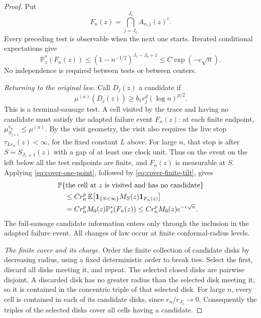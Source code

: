 \documentclass[11pt]{article}
\theoremstyle{definition}
\theoremstyle{remark}
\numberwithin{equation}{section}
\begin{document}
\begin{proof}
Put
\[
 F_n(z)=\bigcap_{j=J_0}^{J_1}A_{n,j}(z)^c.
\]
Every preceding test is observable when the next one starts.
Iterated conditional expectations give
\begin{equation}
 \mathbb P_z^*(F_n(z))
 \le(1-n^{-1/2})^{J_1-J_0+1}
 \le C\exp(-c\sqrt n).
 \label{eq:cover-failure}
\end{equation}
No independence is required between tests or between centers.

\emph{Returning to the original law.}
Call \(D_j(z)\) a candidate if
\begin{equation}
 \mu^{(n)}(D_j(z))\ge b_1r_j^d(\log n)^{p/2}.
 \label{eq:cover-candidate}
\end{equation}
This is a terminal-sausage test. A cell visited by the trace and
having no candidate must satisfy the adapted failure event \(F_n(z)\):
at each finite endpoint, \(\mu_{S_{j+1}}^{v_n}\le\mu^{(n)}\).
By the visit geometry, the visit also requires the
live stop \(\tau_{Lr_n}(z)<\infty\), for the fixed constant
\(L\) above.  For large \(n\), that stop is after
\(S=S_{J_1+1}(z)\) with a gap of at least one clock unit.
Thus on the event on the left below all the test endpoints are finite,
and \(F_n(z)\) is measurable at \(S\).
Applying \eqref{eq:cover-one-point}, followed by
\eqref{eq:cover-finite-tilt}, gives
\begin{align}
 &\mathbb P\{\text{the cell at }z\text{ is visited and has no candidate}\}
       \notag\\
 &\quad\le C r_n^p\,
       \mathbb E\!\left[
         {\bf1}_{\{S<\infty\}}M_S(z){\bf1}_{F_n(z)}\right]
       \notag\\
 &\quad= C r_n^p M_0(z)\mathbb P_z^*(F_n(z))
       \le C r_n^p M_0(z)e^{-c\sqrt n}.
 \label{eq:cover-missed-cell}
\end{align}
The full-sausage candidate information enters only through the
inclusion in the adapted failure event.  All changes of law
occur at finite conformal-radius levels.

\emph{The finite cover and its charge.}
Order the finite collection of candidate disks by decreasing
radius, using a fixed deterministic order to break ties.
Select the first, discard all disks meeting it, and repeat.
The selected closed disks are pairwise disjoint.  A discarded
disk has no greater radius than the selected disk meeting it,
so it is contained in the concentric triple of that selected
disk.  For large \(n\), every cell is contained in each of its
candidate disks, since \(r_n/r_{J_1}\to0\).  Consequently the
triples of the selected disks cover all cells having a candidate.


\end{proof}
\end{document}
